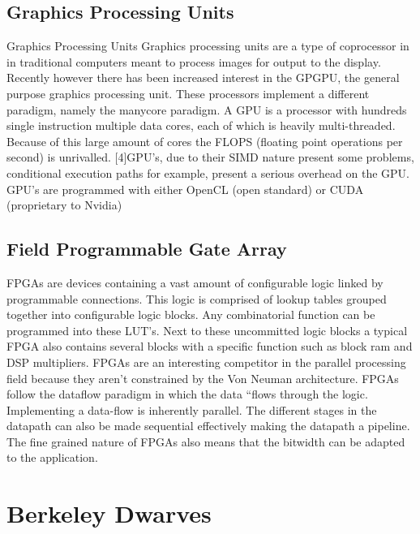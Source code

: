 \documentclass[../thesis.tex]{subfiles}
\begin{document}
\subsection{Graphics Processing Units} Graphics Processing Units
Graphics processing units are a type of coprocessor in in traditional computers meant to process images for output to the display. Recently however there has been increased interest in the GPGPU, the general purpose graphics processing unit. These processors implement a different paradigm, namely the manycore paradigm. A  GPU is a processor with hundreds single instruction multiple data cores, each of which is heavily multi-threaded. Because of this large amount of cores the FLOPS (floating point operations per second) is unrivalled. [4]GPU's, due to their SIMD nature present some problems, conditional execution paths for example, present a serious overhead on the GPU. GPU's are programmed with either OpenCL (open standard) or CUDA (proprietary to Nvidia)

\subsection{Field Programmable Gate Array} 
FPGAs are devices containing a vast amount of configurable logic linked by programmable connections. This logic is comprised of lookup tables grouped together into configurable logic blocks. Any combinatorial function can be programmed into these LUT's. Next to these uncommitted logic blocks a typical FPGA also contains several blocks with a specific function such as block ram and DSP multipliers. FPGAs are an interesting competitor in the parallel processing field because they aren't constrained by the Von Neuman architecture. FPGAs follow the dataflow paradigm in which the data “flows through the logic. Implementing a data-flow is inherently parallel. The different stages in the datapath can also be made sequential effectively making the datapath a pipeline. The fine grained nature of FPGAs also means that the bitwidth can be adapted to the application.


\section{Berkeley Dwarves}
\end{document}
